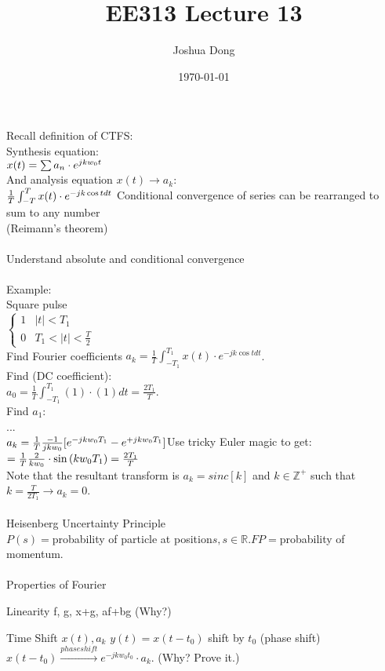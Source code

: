 \documentclass{article}
\begin{document}
\title{EE313\: Lecture 13}
\author{Joshua Dong}
\date{\today}
\maketitle

Recall definition of CTFS:
\\Synthesis equation:
\\$x(t) = \sum a_n \cdot e^{jkw_0t}
\\$
\\And analysis equation $x(t) \rightarrow a_k$:
\\$\frac{1}{T}\int_{-T}^{T} x(t) \cdot e^{-jk\cos{t} dt}
\\$
Conditional convergence of series can be rearranged to sum to any number
\\(Reimann's theorem)
\\
\\Understand absolute and conditional convergence
\\
\\Example:
\\Square pulse
\\$
\begin{cases} 
    1 & |t| < T_1 \\
    0 & T_1 < |t| < \frac{T}{2}
\end{cases}$
\\Find Fourier coefficients $a_k =
\frac{1}{T}\int_{-T_1}^{T_1} x(t) \cdot e^{-jk\cos{t} dt}$.
\\Find (DC coefficient):
\\$a_0 = \frac{1}{T}\int_{-T_1}^{T_1} (1) \cdot (1) dt =
\frac{2T_1}{T}$.
\\Find $a_1$:
\\...
\\$a_k = \frac{1}{T}\frac{-1}{jkw_0}
[e^{-jkw_0T_1} - e^{+jkw_0T_1}]
\\$Use tricky Euler magic to get:
\\$= \frac{1}{T}\frac{2}{kw_0} \cdot \sin{(kw_0T_1)}
\\= \frac{2T_1}{T}$
\\Note that the resultant transform is $a_k = sinc[k]$ and
$k \in \mathbb{Z}^+$ such that $k = \frac{T}{2T_1} \rightarrow a_k = 0$.
\\
\\Heisenberg Uncertainty Principle
\\$P(s) =  $probability of particle at position$ s, s \in \mathbb{R}.
F{P} = $probability of momentum.
\\
\\Properties of Fourier
\begin{description}
    \item{Linearity}
        f, g, x+g, af+bg
        (Why?)
    \item{Time Shift}
        $x(t), a_k$
        $y(t) = x(t-t_0)$ shift by $t_0$ (phase shift)
        $x(t-t_0) \xrightarrow{phase shift} e^{-jkw_0t_0} \cdot a_k$.
        (Why? Prove it.)
\end{description}
 
\end{document}
